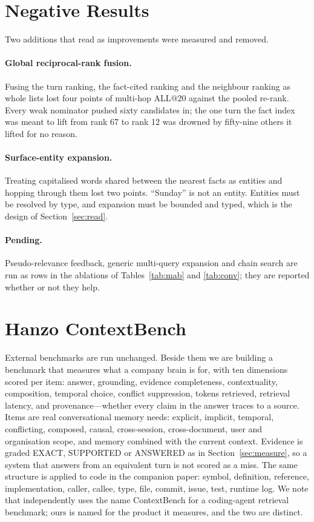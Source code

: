\documentclass[11pt]{article}
\begin{document}
\section{Negative Results}
\label{sec:negative}

Two additions that read as improvements were measured and removed.

\paragraph{Global reciprocal-rank fusion.} Fusing the turn ranking, the
fact-cited ranking and the neighbour ranking as whole lists lost four points
of multi-hop ALL@20 against the pooled re-rank. Every weak nominator pushed
sixty candidates in; the one turn the fact index was meant to lift from rank
67 to rank 12 was drowned by fifty-nine others it lifted for no reason.

\paragraph{Surface-entity expansion.} Treating capitalised words shared
between the nearest facts as entities and hopping through them lost two
points. ``Sunday'' is not an entity. Entities must be resolved by type, and
expansion must be bounded and typed, which is the design of
Section~\ref{sec:read}.

\paragraph{Pending.} Pseudo-relevance feedback, generic multi-query
expansion and chain search are run as rows in the ablations of
Tables~\ref{tab:mab} and \ref{tab:conv}; they are reported whether or not
they help.

\section{Hanzo ContextBench}
\label{sec:contextbench}

External benchmarks are run unchanged. Beside them we are building a
benchmark that measures what a company brain is for, with ten dimensions
scored per item: answer, grounding, evidence completeness, contextuality,
composition, temporal choice, conflict suppression, tokens retrieved,
retrieval latency, and provenance---whether every claim in the answer
traces to a source. Items are real conversational memory needs: explicit,
implicit, temporal, conflicting, composed, causal, cross-session,
cross-document, user and organisation scope, and memory combined with the
current context. Evidence is graded EXACT, SUPPORTED or ANSWERED as in
Section~\ref{sec:measure}, so a system that answers from an equivalent turn
is not scored as a miss. The same structure is applied to code in the
companion paper: symbol, definition, reference, implementation, caller,
callee, type, file, commit, issue, test, runtime log. We note that
\cite{contextbench} independently uses the name ContextBench for a
coding-agent retrieval benchmark; ours is named for the product it
measures, and the two are distinct.
\end{document}
